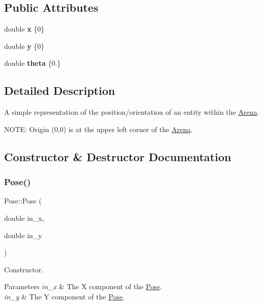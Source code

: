 \subsection*{Public Attributes}
\begin{DoxyCompactItemize}
\item 
\mbox{\label{struct_pose_a0061c7789df90f593ab95118cbef387f}} 
double {\bfseries x} \{0\}
\item 
\mbox{\label{struct_pose_a6280216efe0840a7a55f025ad04e3b3d}} 
double {\bfseries y} \{0\}
\item 
\mbox{\label{struct_pose_a25709c116282114c9f512b205f3f1133}} 
double {\bfseries theta} \{0.\}
\end{DoxyCompactItemize}


\subsection{Detailed Description}
A simple representation of the position/orientation of an entity within the \mbox{\hyperlink{class_arena}{Arena}}. 

N\+O\+TE\+: Origin (0,0) is at the upper left corner of the \mbox{\hyperlink{class_arena}{Arena}}. 

\subsection{Constructor \& Destructor Documentation}
\mbox{\label{struct_pose_ac947d7046547d883f782ab2408cb80ed}} 
\subsubsection{\texorpdfstring{Pose()}{Pose()}}
{\footnotesize\ttfamily Pose\+::\+Pose (\begin{DoxyParamCaption}\item[{double}]{in\+\_\+x,  }\item[{double}]{in\+\_\+y }\end{DoxyParamCaption})\hspace{0.3cm}{\ttfamily [inline]}}



Constructor. 


\begin{DoxyParams}{Parameters}
{\em in\+\_\+x} & The X component of the \mbox{\hyperlink{struct_pose}{Pose}}. \\
\hline
{\em in\+\_\+y} & The Y component of the \mbox{\hyperlink{struct_pose}{Pose}}. \\
\hline
\end{DoxyParams}


